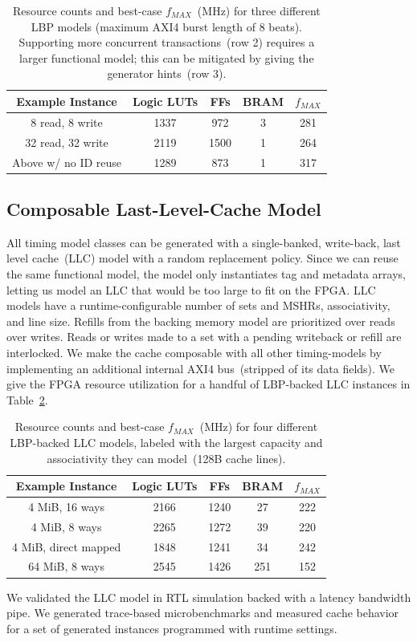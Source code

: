 \begin{table}[htb]
\centering
    \vspace{-0.05in}
    \begin{tabular}{c c c c c }
	\hline
        \textbf{Example Instance} & Logic LUTs & FFs & BRAM & $f_{MAX}$ \\
	\hline
        8 read, 8 write & 1337 & 972 & 3 &  281 \\
        32 read, 32 write & 2119 & 1500 & 1 & 264 \\
        Above w/ no ID reuse & 1289 & 873 & 1 & 317 \\
	\hline
	\end{tabular}
    \caption{Resource counts and best-case $f_{MAX}$~(MHz) for three different
    LBP models (maximum AXI4 burst length of 8 beats). Supporting more concurrent transactions~(row 2) requires a larger
    functional model; this can be mitigated by giving the generator hints~(row 3).}
\vspace{-0.3in}
\label{tbl:lbp-model-resources}
\end{table}

\vspace{-0.05in}
\subsection{Composable Last-Level-Cache Model}
All timing model classes can be generated with a single-banked, write-back,
last level cache~(LLC) model with a random replacement policy.  Since we can
reuse the same functional model, the model only instantiates tag and metadata
arrays, letting us model an LLC that would be too
large to fit on the FPGA. \PNAME LLC models have a runtime-configurable number of sets
and MSHRs, associativity, and line size. Refills from the backing memory model
are prioritized over reads over writes. Reads or writes made to a set with a
pending writeback or refill are interlocked.  We make the cache composable with
all other timing-models by implementing an additional internal AXI4
bus~(stripped of its data fields). We give the FPGA resource utilization for a
handful of LBP-backed LLC instances in
Table~\ref{tbl:llc-model-resources}.
\begin{table}[htb]
\centering
    \vspace{-0.05in}
    \begin{tabular}{c c c c c}
	\hline
        \textbf{Example Instance} & Logic LUTs & FFs & BRAM & $f_{MAX}$ \\
	\hline
        4 MiB, 16 ways & 2166 & 1240 & 27 & 222 \\
        4 MiB, 8 ways  & 2265 & 1272 & 39 & 220 \\
        4 MiB, direct mapped & 1848 & 1241 & 34 & 242 \\
        64 MiB, 8 ways & 2545 & 1426 & 251 & 152 \\
	\hline
	\end{tabular}
    \caption{Resource counts and best-case $f_{MAX}$~(MHz) for four different
    LBP-backed LLC models, labeled with the largest capacity and associativity they can model~(128B cache lines).}
\label{tbl:llc-model-resources}
\vspace{-0.3in}
\end{table}

We validated the LLC model in RTL simulation backed with a latency bandwidth
pipe. We generated trace-based microbenchmarks and measured cache behavior
for a set of generated instances programmed with runtime settings.
